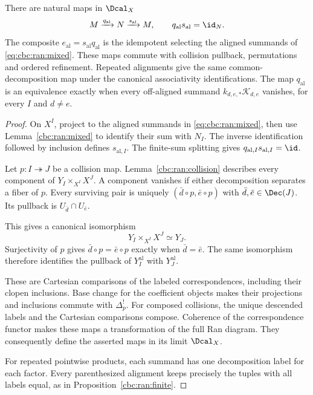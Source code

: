 \begin{theorem}
\label{cbc:ran:global}
There are natural maps in $\Dcal_X$
\[
 M\xrightarrow{q_{\mathrm{al}}}N
   \xrightarrow{s_{\mathrm{al}}}M,
 \qquad q_{\mathrm{al}}s_{\mathrm{al}}=\id_N.
\]
The composite $e_{\mathrm{al}}=s_{\mathrm{al}}q_{\mathrm{al}}$ is the
idempotent selecting the aligned summands of
\eqref{eq:cbc:ran:mixed}. These maps commute with collision pullback,
permutations and ordered refinement. Repeated alignments give the same
common-decomposition map under the canonical associativity identifications.
The map $q_{\mathrm{al}}$ is an equivalence exactly when every off-aligned
summand $k_{d,e,*}\mathcal K_{d,e}$ vanishes, for every $I$ and $d\ne e$.
\end{theorem}
\begin{proof}
On $X^I$, project to the aligned summands in
\eqref{eq:cbc:ran:mixed}, then use Lemma~\ref{cbc:ran:mixed} to identify
their sum with $N_I$. The inverse identification followed by inclusion
defines $s_{\mathrm{al},I}$. The finite-sum splitting gives
$q_{\mathrm{al},I}s_{\mathrm{al},I}=\id$.

Let $p:I\twoheadrightarrow J$ be a collision map.
Lemma~\ref{cbc:ran:collision} describes every component of
$Y_I\times_{X^I}X^J$. A component vanishes if either decomposition
separates a fiber of $p$. Every surviving pair is uniquely
$(\bar d\circ p,\bar e\circ p)$ with
$\bar d,\bar e\in\Dec(J)$.
Its pullback is $U_{\bar d}\cap U_{\bar e}$.

This gives a canonical isomorphism
\[
 Y_I\times_{X^I}X^J\simeq Y_J.
\]
Surjectivity of $p$ gives $\bar d\circ p=\bar e\circ p$ exactly when
$\bar d=\bar e$. The same isomorphism therefore identifies the pullback
of $Y_I^{\mathrm{al}}$ with $Y_J^{\mathrm{al}}$.

These are Cartesian comparisons of the labeled correspondences,
including their clopen inclusions. Base change for the coefficient
objects makes their projections and inclusions commute with $\Delta_p^!$.
For composed collisions, the unique descended labels and the Cartesian
comparisons compose. Coherence of the correspondence functor makes
these maps a transformation of the full Ran diagram.
They consequently define the asserted maps in its limit $\Dcal_X$.

For repeated pointwise products, each summand has one decomposition
label for each factor. Every parenthesized alignment keeps precisely
the tuples with all labels equal, as in Proposition~\ref{cbc:ran:finite}.


\end{proof}
